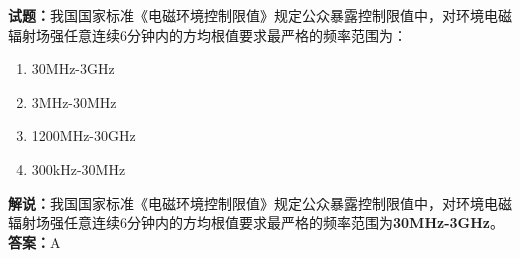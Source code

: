 \documentclass{ctexbook}
\begin{document}
%


%
%


\noindent\textbf{试题：}我国国家标准《电磁环境控制限值》规定公众暴露控制限值中，对环境电磁辐射场强任意连续6分钟内的方均根值要求最严格的频率范围为： 
\begin{enumerate}[leftmargin=3em]
	\item 30MHz-3GHz
	\item 3MHz-30MHz
	\item 1200MHz-30GHz
	\item 300kHz-30MHz
\end{enumerate}
\noindent\textbf{解说：}我国国家标准《电磁环境控制限值》规定公众暴露控制限值中，对环境电磁辐射场强任意连续6分钟内的方均根值要求最严格的频率范围为\textbf{30MHz-3GHz}。\\
\textbf{答案：}A
\end{document}

